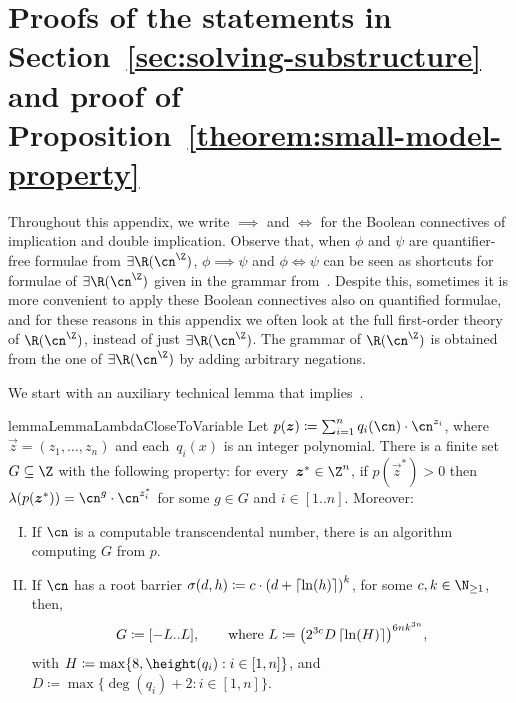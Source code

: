 \section{Proofs of the statements in Section~\ref{sec:solving-substructure} and proof of Proposition~\ref{theorem:small-model-property}}\label{appendix:solving-substructure}

Throughout this appendix, we write $\implies$ and $\iff$ for the Boolean
connectives of implication and double implication. Observe that, when $\phi$ and
$\psi$ are quantifier-free formulae from $\exists\R(\ipow{\cn})$, $\phi \implies
\psi$ and $\phi \iff \psi$ can be seen as shortcuts for formulae of
$\exists\R(\ipow{\cn})$ given in the grammar from~.
Despite this, sometimes it is more convenient to apply these Boolean connectives
also on quantified formulae, and for these reasons in this appendix we often look
at the full first-order theory of $\R(\ipow{\cn})$, instead of just
$\exists\R(\ipow{\cn})$. The grammar of $\R(\ipow{\cn})$ is obtained from the
one of $\exists\R(\ipow{\cn})$ by adding arbitrary negations.

We start with an auxiliary technical lemma that implies~.

\begin{restatable}{lemma}{LemmaLambdaCloseToVariable}\label{lemma:lambda-close-to-variable}
  Let $p(\vec{z}) \coloneqq \sum_{i=1}^n q_i(\cn) \cdot \cn^{z_i}$,
  where $\vec z = (z_1,\dots,z_n)$ and each~$q_i(x)$ is an integer polynomial.
  There is a finite set $G \subseteq \Z$ with the following property: 
  for every~${\vec z^* \in \Z^n}$,
  if $p(\vec z^*) > 0$
  then $\lambda(p(\vec z^*)) = \cn^g \cdot \cn^{z_i^*}$ for some
  $g \in G$ and $i \in [1..n]$.
  Moreover:
  \begin{enumerate}[I.]
    \item\label{lemma:lambda-close-to-variable:i1} If $\cn$ is a computable transcendental number, there is an
          algorithm computing $G$ from $p$.
    \item\label{lemma:lambda-close-to-variable:i2} If $\cn$ has a root barrier $\sigma(d,h) \coloneqq c \cdot
            {(d+\ensuremath{\left\lceil\ln(h)\right\rceil})}^k$, for some $c,k \in \N_{\geq 1}$, then,
            \begin{equation*}
              G\coloneqq{\left[-L..L\right]},
              \qquad 
              \text{where }
              L \coloneqq {\left(2^{3c}D\ceil{\ln(H)}\right)}^{6nk^{3n}},
            \end{equation*}
            with $H \coloneqq \max\{8,\height(q_i) : i \in [1,n]\}$, and $D \coloneqq \max\{\deg(q_i)+2 : i \in [1,n]\}$.
  \end{enumerate}

\end{restatable}

